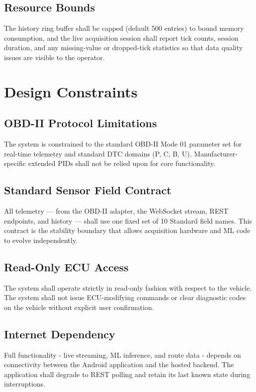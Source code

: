 \documentclass[10pt,a4paper]{report}
\begin{document}
\subsection{Resource Bounds}
The history ring buffer shall be capped (default 500 entries) to bound memory consumption, and the live acquisition session shall report tick counts, session duration, and any missing-value or dropped-tick statistics so that data quality issues are visible to the operator. \par

\section{Design Constraints}

\subsection{OBD-II Protocol Limitations}
The system is constrained to the standard OBD-II Mode 01 parameter set for real-time telemetry and standard DTC domains (P, C, B, U). Manufacturer-specific extended PIDs shall not be relied upon for core functionality. \par

\subsection{Standard Sensor Field Contract}
All telemetry — from the OBD-II adapter, the WebSocket stream, REST endpoints, and history — shall use one fixed set of 10 Standard field names. This contract is the stability boundary that allows acquisition hardware and ML code to evolve independently.\par

\subsection{Read-Only ECU Access}
The system shall operate strictly in read-only fashion with respect to the vehicle. The system shall not issue ECU-modifying commands or clear diagnostic codes on the vehicle without explicit user confirmation. \par
\subsection{Internet Dependency}
Full functionality - live streaming, ML inference, and route data - depends on connectivity between the Android application and the hosted backend. The application shall degrade to REST polling and retain its last known state during interruptions. \par
\end{document}

